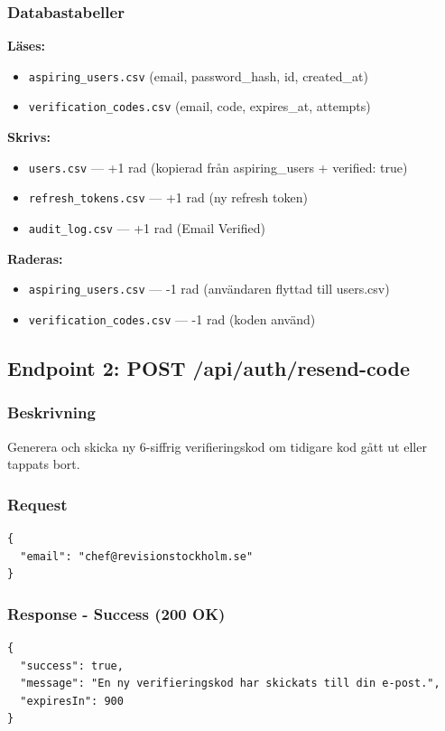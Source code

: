 \documentclass[12pt,a4paper]{article}
\begin{document}
\subsubsection{Databastabeller}
\textbf{Läses:}
\begin{itemize}[noitemsep]
  \item \texttt{aspiring\_users.csv} (email, password\_hash, id, created\_at)
  \item \texttt{verification\_codes.csv} (email, code, expires\_at, attempts)
\end{itemize}

\textbf{Skrivs:}
\begin{itemize}[noitemsep]
  \item \texttt{users.csv} — +1 rad (kopierad från aspiring\_users + verified: true)
  \item \texttt{refresh\_tokens.csv} — +1 rad (ny refresh token)
  \item \texttt{audit\_log.csv} — +1 rad (Email Verified)
\end{itemize}

\textbf{Raderas:}
\begin{itemize}[noitemsep]
  \item \texttt{aspiring\_users.csv} — -1 rad (användaren flyttad till users.csv)
  \item \texttt{verification\_codes.csv} — -1 rad (koden använd)
\end{itemize}

\subsection{Endpoint 2: POST /api/auth/resend-code}

\subsubsection{Beskrivning}
Generera och skicka ny 6-siffrig verifieringskod om tidigare kod gått ut eller tappats bort.

\subsubsection{Request}
\begin{lstlisting}
{
  "email": "chef@revisionstockholm.se"
}
\end{lstlisting}

\subsubsection{Response - Success (200 OK)}
\begin{lstlisting}
{
  "success": true,
  "message": "En ny verifieringskod har skickats till din e-post.",
  "expiresIn": 900
}
\end{lstlisting}
\end{document}
